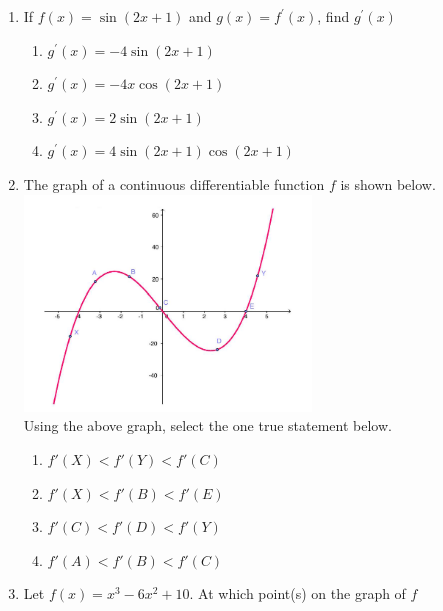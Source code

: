 \documentclass{article}
\begin{document}
\begin{enumerate}
\begin{minipage}[t]{\linewidth}
\begin{enumerate}
		\end{enumerate}
	\end{minipage}
	\item
	\begin{minipage}[t]{\linewidth}
		If \(f(x)=\sin \left(2x +1\right)\) and \(g(x) = f^{\prime}(x)\), find
\(g^{\prime}(x)\)\\[0.1em]
		\begin{enumerate}
		\itemsep1em
			\item  $g^{\prime}(x) = -4 \sin (2x + 1)$
			\item  $g^{\prime}(x) = -4x \cos(2x + 1)$
			\item  $g^{\prime}(x) = 2 \sin (2x + 1)$
			\item  $g^{\prime}(x) = 4 \sin(2x + 1) \cos(2x + 1)$
		\end{enumerate}
	\end{minipage}
	\item
	\begin{minipage}[t]{\linewidth}
		The graph of a continuous differentiable function \(f\) is shown
below.\\
\includegraphics[width=0.6\textwidth,height=\textheight]{graph1.PNG}\\
Using the above graph, select the one true statement below.\\[0.1em]
		\begin{enumerate}
		\itemsep1em
			\item  $f'(X) < f'(Y) < f'(C)$
			\item  $f'(X) < f'(B) < f'(E)$
			\item  $f'(C) < f'(D) < f'(Y)$
			\item  $f'(A) < f'(B) < f'(C)$
		\end{enumerate}
	\end{minipage}
	\item
	\begin{minipage}[t]{\linewidth}
		Let \(f(x)=x^{3}-6 x^{2}+10\). At which point(s) on the graph of \(f\)

\end{minipage}
\end{enumerate}
\end{document}

